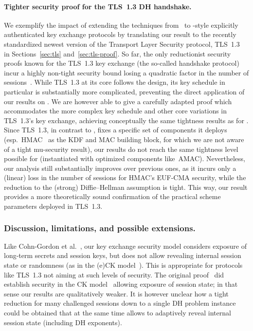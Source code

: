 \paragraph{Tighter security proof for the TLS~1.3 DH handshake.}
We exemplify the impact of extending the techniques from~\cite{C:CCGJJ19} to \SIGMA-style explicitly authenticated key exchange protocols
by translating our \SIGMAI result to the recently standardized newest version of the Transport Layer Security protocol, TLS~1.3~\cite{rfc8446} in Sections~\ref{sec:tls} and~\ref{sec:tls-proof}.
So far, the only reductionist security proofs known for the TLS~1.3 key exchange (the so-called handshake protocol) incur a highly non-tight security bound losing a quadratic factor in the number of sessions~\cite{CCS:DFGS15,EPRINT:DFGS16,EuroSP:FisGue17}.
While TLS~1.3 at its core follows the \SIGMAI design, its key schedule in particular is substantially more complicated, preventing the direct application of our results on \SIGMAI.
We are however able to give a carefully adapted proof which accommodates the more complex key schedule and other core variations in TLS~1.3's key exchange, achieving conceptually the same tightness results as for \SIGMAI.
Since TLS~1.3, in contrast to \SIGMA, fixes a specific set of components it deploys (esp.\ HMAC~\cite{C:BelCanKra96} as the KDF and MAC building block, for which we are not aware of a tight mu-security result),
our results do not reach the same tightness level possible for \SIGMA (instantiated with optimized components like~AMAC).
Nevertheless, our analysis still substantially improves over previous ones, as it incurs only a (linear) loss in the number of sessions for HMAC's EUF-CMA security, while the reduction to the (strong) Diffie--Hellman assumption is tight.
This way, our result provides a more theoretically sound confirmation of the practical scheme parameters deployed in TLS~1.3.


\subsubsection*{Discussion, limitations, and possible extensions.}

Like Cohn-Gordon et al.~\cite{C:CCGJJ19}, our key exchange security model considers exposure of long-term secrets and session keys, but does not allow revealing internal session state or randomness (as in the (e)CK model~\cite{EC:CanKra01,PROVSEC:LaMLauMit07}).
This is appropriate for protocols like TLS~1.3 not aiming at such levels of security.
The original \SIGMA proof~\cite{C:CanKra02} did establish security in the CK model~\cite{EC:CanKra01} allowing exposure of session state; in that sense our results are qualitatively weaker.
It is however unclear how a tight reduction for many challenged sessions down to a single DH problem instance could be obtained that at the same time allows to adaptively reveal internal session state (including DH exponents).

